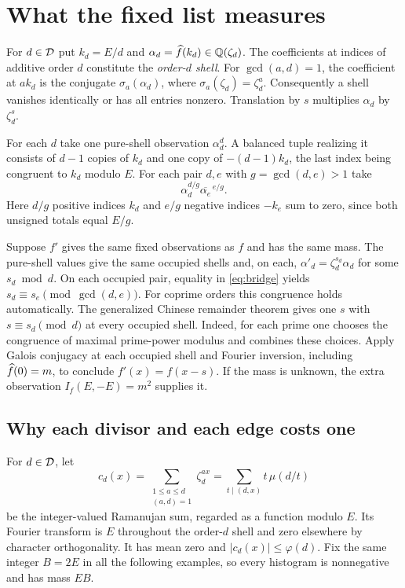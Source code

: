 \documentclass[11pt]{article}
\begin{document}
\section{What the fixed list measures}
For $d\in\mathcal D$ put $k_d=E/d$ and $\alpha_d=\widehat f(k_d)\in\mathbb Q(\zeta_d)$. The coefficients at indices of additive order $d$ constitute the \emph{order-$d$ shell}. For $\gcd(a,d)=1$, the coefficient at $ak_d$ is the conjugate $\sigma_a(\alpha_d)$, where $\sigma_a(\zeta_d)=\zeta_d^a$. Consequently a shell vanishes identically or has all entries nonzero. Translation by $s$ multiplies $\alpha_d$ by $\zeta_d^s$.

For each $d$ take one pure-shell observation $\alpha_d^d$. A balanced tuple realizing it consists of $d-1$ copies of $k_d$ and one copy of $-(d-1)k_d$, the last index being congruent to $k_d$ modulo $E$. For each pair $d,e$ with $g=\gcd(d,e)>1$ take
\begin{equation}\label{eq:bridge}
 \alpha_d^{d/g}\overline{\alpha_e}^{\,e/g}.
\end{equation}
Here $d/g$ positive indices $k_d$ and $e/g$ negative indices $-k_e$ sum to zero, since both unsigned totals equal $E/g$.

Suppose $f'$ gives the same fixed observations as $f$ and has the same mass. The pure-shell values give the same occupied shells and, on each, $\alpha'_d=\zeta_d^{s_d}\alpha_d$ for some $s_d\bmod d$. On each occupied pair, equality in \eqref{eq:bridge} yields $s_d\equiv s_e\pmod{\gcd(d,e)}$. For coprime orders this congruence holds automatically. The generalized Chinese remainder theorem gives one $s$ with $s\equiv s_d\pmod d$ at every occupied shell. Indeed, for each prime one chooses the congruence of maximal prime-power modulus and combines these choices. Apply Galois conjugacy at each occupied shell and Fourier inversion, including $\widehat f(0)=m$, to conclude $f'(x)=f(x-s)$. If the mass is unknown, the extra observation $I_f(E,-E)=m^2$ supplies it.

\subsection*{Why each divisor and each edge costs one}
For $d\in\mathcal D$, let
\[
 c_d(x)=\sum_{\substack{1\le a\le d\\ (a,d)=1}}\zeta_d^{ax}
       =\sum_{t\mid(d,x)} t\,\mu(d/t)
\]
be the integer-valued Ramanujan sum, regarded as a function modulo $E$. Its Fourier transform is $E$ throughout the order-$d$ shell and zero elsewhere by character orthogonality. It has mean zero and $|c_d(x)|\le\varphi(d)$. Fix the same integer $B=2E$ in all the following examples, so every histogram is nonnegative and has mass $EB$.
\end{document}
